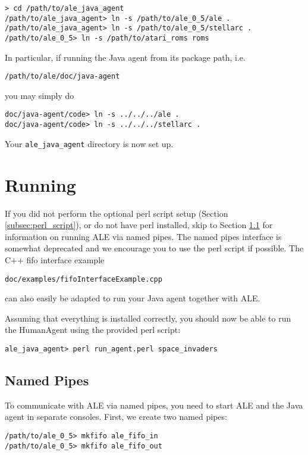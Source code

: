 \documentclass[12pt]{article}
\begin{document}
\begin{verbatim}
> cd /path/to/ale_java_agent
/path/to/ale_java_agent> ln -s /path/to/ale_0_5/ale . 
/path/to/ale_java_agent> ln -s /path/to/ale_0_5/stellarc . 
/path/to/ale_0_5> ln -s /path/to/atari_roms roms
\end{verbatim}

In particular, if running the Java agent from its package path, i.e. 
\begin{center}\verb+/path/to/ale/doc/java-agent+\end{center} you may simply do
\begin{verbatim}
doc/java-agent/code> ln -s ../../../ale . 
doc/java-agent/code> ln -s ../../../stellarc .  
\end{verbatim}

Your \verb+ale_java_agent+ directory is now set up.

\section{Running}

If you did not perform the optional perl script setup (Section 
\ref{subsec:perl_script}), or do not have perl installed, skip to Section 
\ref{subsec:named_pipes} for information on running ALE via named pipes. The named pipes
interface is somewhat deprecated and we encourage you to use the perl script if possible. The
C++ fifo interface example
\begin{center}\verb+doc/examples/fifoInterfaceExample.cpp+\end{center}
can also easily be adapted to run your Java agent together with ALE.

Assuming that everything is installed correctly, you should now be able to
run the HumanAgent using the provided perl script:

\begin{verbatim}
ale_java_agent> perl run_agent.perl space_invaders 
\end{verbatim}

\subsection{Named Pipes}\label{subsec:named_pipes}

To communicate with ALE via named pipes, you need to start ALE and the Java
agent in separate consoles. First, we create two named pipes:

\begin{verbatim}
/path/to/ale_0_5> mkfifo ale_fifo_in
/path/to/ale_0_5> mkfifo ale_fifo_out
\end{verbatim}
\end{document}
